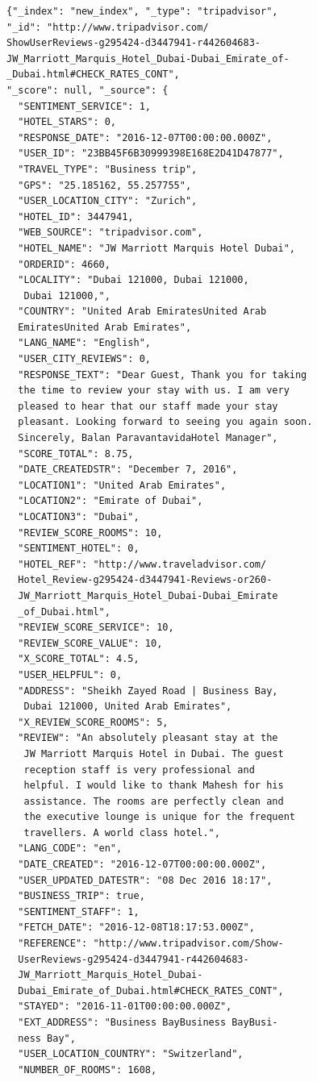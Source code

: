 \documentclass[czech,BP]{thesiskiv}
\begin{document}
	\begin{lstlisting}[caption=Příkald recenze]
{"_index": "new_index", "_type": "tripadvisor",
"_id": "http://www.tripadvisor.com/
ShowUserReviews-g295424-d3447941-r442604683-
JW_Marriott_Marquis_Hotel_Dubai-Dubai_Emirate_of-
_Dubai.html#CHECK_RATES_CONT",
"_score": null, "_source": {
  "SENTIMENT_SERVICE": 1,
  "HOTEL_STARS": 0,
  "RESPONSE_DATE": "2016-12-07T00:00:00.000Z",
  "USER_ID": "23BB45F6B30999398E168E2D41D47877",
  "TRAVEL_TYPE": "Business trip",
  "GPS": "25.185162, 55.257755",
  "USER_LOCATION_CITY": "Zurich",
  "HOTEL_ID": 3447941,
  "WEB_SOURCE": "tripadvisor.com",
  "HOTEL_NAME": "JW Marriott Marquis Hotel Dubai",
  "ORDERID": 4660,
  "LOCALITY": "Dubai 121000, Dubai 121000,
   Dubai 121000,",
  "COUNTRY": "United Arab EmiratesUnited Arab 
  EmiratesUnited Arab Emirates",
  "LANG_NAME": "English",
  "USER_CITY_REVIEWS": 0,
  "RESPONSE_TEXT": "Dear Guest, Thank you for taking
  the time to review your stay with us. I am very
  pleased to hear that our staff made your stay
  pleasant. Looking forward to seeing you again soon.
  Sincerely, Balan ParavantavidaHotel Manager",
  "SCORE_TOTAL": 8.75,
  "DATE_CREATEDSTR": "December 7, 2016",
  "LOCATION1": "United Arab Emirates",
  "LOCATION2": "Emirate of Dubai",
  "LOCATION3": "Dubai",
  "REVIEW_SCORE_ROOMS": 10,
  "SENTIMENT_HOTEL": 0,
  "HOTEL_REF": "http://www.traveladvisor.com/
  Hotel_Review-g295424-d3447941-Reviews-or260-
  JW_Marriott_Marquis_Hotel_Dubai-Dubai_Emirate
  _of_Dubai.html",
  "REVIEW_SCORE_SERVICE": 10,
  "REVIEW_SCORE_VALUE": 10,
  "X_SCORE_TOTAL": 4.5,
  "USER_HELPFUL": 0,
  "ADDRESS": "Sheikh Zayed Road | Business Bay,
   Dubai 121000, United Arab Emirates",
  "X_REVIEW_SCORE_ROOMS": 5,
  "REVIEW": "An absolutely pleasant stay at the
   JW Marriott Marquis Hotel in Dubai. The guest
   reception staff is very professional and 
   helpful. I would like to thank Mahesh for his
   assistance. The rooms are perfectly clean and
   the executive lounge is unique for the frequent
   travellers. A world class hotel.",   
  "LANG_CODE": "en",
  "DATE_CREATED": "2016-12-07T00:00:00.000Z",
  "USER_UPDATED_DATESTR": "08 Dec 2016 18:17",
  "BUSINESS_TRIP": true,
  "SENTIMENT_STAFF": 1,
  "FETCH_DATE": "2016-12-08T18:17:53.000Z",
  "REFERENCE": "http://www.tripadvisor.com/Show-
  UserReviews-g295424-d3447941-r442604683-
  JW_Marriott_Marquis_Hotel_Dubai-
  Dubai_Emirate_of_Dubai.html#CHECK_RATES_CONT",
  "STAYED": "2016-11-01T00:00:00.000Z",
  "EXT_ADDRESS": "Business BayBusiness BayBusi-
  ness Bay",
  "USER_LOCATION_COUNTRY": "Switzerland",
  "NUMBER_OF_ROOMS": 1608,

\end{lstlisting}
\end{document}
